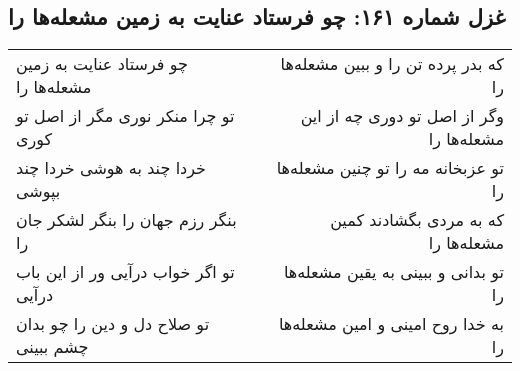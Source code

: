 \begin{center}
\section*{غزل شماره ۱۶۱: چو فرستاد عنایت به زمین مشعله‌ها را}
\label{sec:0161}
\begin{longtable}{l p{0.5cm} r}
چو فرستاد عنایت به زمین مشعله‌ها را
&&
که بدر پرده تن را و ببین مشعله‌ها را
\\
تو چرا منکر نوری مگر از اصل تو کوری
&&
وگر از اصل تو دوری چه از این مشعله‌ها را
\\
خردا چند به هوشی خردا چند بپوشی
&&
تو عزبخانه مه را تو چنین مشعله‌ها را
\\
بنگر رزم جهان را بنگر لشکر جان را
&&
که به مردی بگشادند کمین مشعله‌ها را
\\
تو اگر خواب درآیی ور از این باب درآیی
&&
تو بدانی و ببینی به یقین مشعله‌ها را
\\
تو صلاح دل و دین را چو بدان چشم ببینی
&&
به خدا روح امینی و امین مشعله‌ها را
\\
\end{longtable}
\end{center}

